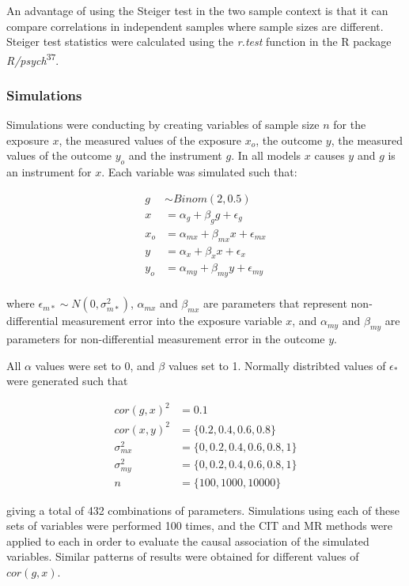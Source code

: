 \documentclass[]{article}
\begin{document}
An advantage of using the Steiger test in the two sample context is that
it can compare correlations in independent samples where sample sizes
are different. Steiger test statistics were calculated using the
\emph{r.test} function in the R package
\emph{R/psych}\textsuperscript{37}.

\subsubsection{Simulations}\label{simulations}

Simulations were conducting by creating variables of sample size \(n\)
for the exposure \(x\), the measured values of the exposure \(x_o\), the
outcome \(y\), the measured values of the outcome \(y_o\) and the
instrument \(g\). In all models \(x\) causes \(y\) and \(g\) is an
instrument for \(x\). Each variable was simulated such that:

\[
\begin{aligned}
g & \sim Binom(2, 0.5) \\
x & = \alpha_g + \beta_g g + \epsilon_g \\
x_o & = \alpha_{mx} + \beta_{mx} x + \epsilon_{mx} \\
y & = \alpha_x + \beta_x x + \epsilon_x \\
y_o & = \alpha_{my} + \beta_{my} y + \epsilon_{my} \\
\end{aligned}
\]

where \(\epsilon_{m*} \sim N(0, \sigma^2_{m*})\), \(\alpha_{mx}\) and
\(\beta_{mx}\) are parameters that represent non-differential
measurement error into the exposure variable \(x\), and \(\alpha_{my}\)
and \(\beta_{my}\) are parameters for non-differential measurement error
in the outcome \(y\).

All \(\alpha\) values were set to 0, and \(\beta\) values set to 1.
Normally distribted values of \(\epsilon_*\) were generated such that

\[
\begin{aligned}
cor(g, x)^2 & = 0.1 \\
cor(x, y)^2 & = \{0.2, 0.4, 0.6, 0.8\} \\
\sigma^2_{mx} & = \{0, 0.2, 0.4, 0.6, 0.8, 1\} \\
\sigma^2_{my} & = \{0, 0.2, 0.4, 0.6, 0.8, 1\} \\
n & = \{100, 1000, 10000\}
\end{aligned}
\]

giving a total of 432 combinations of parameters. Simulations using each
of these sets of variables were performed 100 times, and the CIT and MR
methods were applied to each in order to evaluate the causal association
of the simulated variables. Similar patterns of results were obtained
for different values of \(cor(g, x)\).
\end{document}
